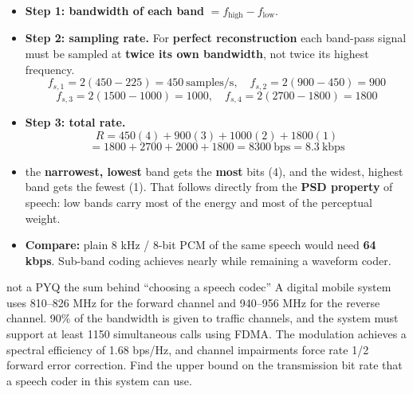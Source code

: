 \begin{itemize}
  \item \textbf{Step 1: bandwidth of each band} $= f_{\text{high}} - f_{\text{low}}$.
  \item \textbf{Step 2: sampling rate.} For \textbf{perfect reconstruction} each band-pass signal
        must be sampled at \textbf{twice its own bandwidth}, not twice its highest frequency.
        \[ f_{s,1} = 2(450-225) = 450\ \text{samples/s}, \quad
           f_{s,2} = 2(900-450) = 900 \]
        \[ f_{s,3} = 2(1500-1000) = 1000, \quad
           f_{s,4} = 2(2700-1800) = 1800 \]
  \item \textbf{Step 3: total rate.}
        \[ R = 450(4) + 900(3) + 1000(2) + 1800(1) \]
        \[ = 1800 + 2700 + 2000 + 1800 = \boxed{8300\ \text{bps} = 8.3\ \text{kbps}} \]
  \item {} the \textbf{narrowest, lowest} band gets the \textbf{most}
        bits (4), and the widest, highest band gets the fewest (1). That follows directly from the
        \textbf{PSD property} of speech: low bands carry most of the energy and most of the
        perceptual weight.
  \item \textbf{Compare:} plain 8 kHz / 8-bit PCM of the same speech would need
        \textbf{64 kbps}. Sub-band coding achieves nearly  while remaining a
        waveform coder.
\end{itemize}

\hr

{\color{sub}\footnotesize {}}

\begin{asked}[PROBLEM]{not a PYQ \textperiodcentered{} the sum behind ``choosing a speech codec'' \added}
A digital mobile system uses 810--826 MHz for the forward channel and 940--956 MHz for the
reverse channel. 90\% of the bandwidth is given to traffic channels, and the system must support
at least 1150 simultaneous calls using FDMA. The modulation achieves a spectral efficiency of
1.68 bps/Hz, and channel impairments force rate 1/2 forward error correction. Find the upper
bound on the transmission bit rate that a speech coder in this system can use.
\end{asked}

